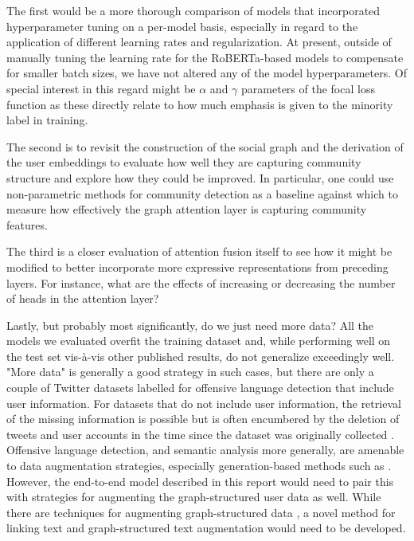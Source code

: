 \documentclass[letterpaper]{article} %
\begin{document}
The first would be a more thorough comparison of models that incorporated hyperparameter tuning on a per-model basis, especially in regard to the application of different learning rates and regularization. At present, outside of manually tuning the learning rate for the RoBERTa-based models to compensate for smaller batch sizes, we have not altered any of the model hyperparameters. Of special interest in this regard might be $\alpha$ and $\gamma$ parameters of the focal loss function as these directly relate to how much emphasis is given to the minority label in training. 

The second is to revisit the construction of the social graph and the derivation of the user embeddings to evaluate how well they are capturing community structure and explore how they could be improved. In particular, one could use non-parametric methods for community detection as a baseline against which to measure how effectively the graph attention layer is capturing community features. 

The third is a closer evaluation of attention fusion itself to see how it might be modified to better incorporate more expressive representations from preceding layers. For instance, what are the effects of increasing or decreasing the number of heads in the attention layer?

Lastly, but probably most significantly, do we just need more data? All the models we evaluated overfit the training dataset and, while performing well on the test set vis-\`a-vis other published results, do not generalize exceedingly well. "More data" is generally a good strategy in such cases, but there are only a couple of Twitter datasets labelled for offensive language detection that include user information. For datasets that do not include user information, the retrieval of the missing information is possible but is often encumbered by the deletion of tweets and user accounts in the time since the dataset was originally collected \citep{Mishra2018}. Offensive language detection, and semantic analysis more generally, are amenable to data augmentation strategies, especially generation-based methods such as \citet{liu2020}. However, the end-to-end model described in this report would need to pair this with strategies for augmenting the graph-structured user data as well. While there are techniques for augmenting graph-structured data \citep{zhao2022}, a novel method for linking text and graph-structured text augmentation would need to be developed.

\appendix


\end{document}
